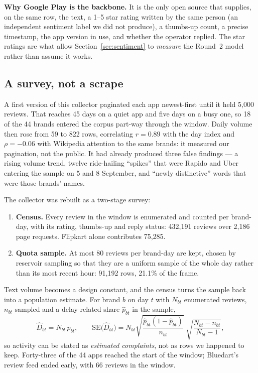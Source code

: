 \documentclass[11pt,a4paper]{article}
\begin{document}
\textbf{Why Google Play is the backbone.} It is the only open source that supplies, on the same row, the text, a 1--5 star rating written by the same person (an independent sentiment label we did not produce), a thumbs-up count, a precise timestamp, the app version in use, and whether the operator replied. The star ratings are what allow Section~\ref{sec:sentiment} to \emph{measure} the Round~2 model rather than assume it works.

\subsection{A survey, not a scrape}

A first version of this collector paginated each app newest-first until it held 5,000 reviews. That reaches 45 days on a quiet app and five days on a busy one, so 18 of the 44 brands entered the corpus part-way through the window. Daily volume then rose from 59 to 822 rows, correlating $r=0.89$ with the day index and $\rho=-0.06$ with Wikipedia attention to the same brands: it measured our pagination, not the public. It had already produced three false findings --- a rising volume trend, twelve ride-hailing ``spikes'' that were Rapido and Uber entering the sample on 5 and 8 September, and ``newly distinctive'' words that were those brands' names.

The collector was rebuilt as a two-stage survey:
\begin{enumerate}
\item \textbf{Census.} Every review in the window is enumerated and counted per brand-day, with its rating, thumbs-up and reply status: 432,191 reviews over 2,186 page requests. Flipkart alone contributes 75,285.
\item \textbf{Quota sample.} At most 80 reviews per brand-day are kept, chosen by reservoir sampling so that they are a uniform sample of the whole day rather than its most recent hour: 91,192 rows, 21.1\% of the frame.
\end{enumerate}
Text volume becomes a design constant, and the census turns the sample back into a population estimate. For brand $b$ on day $t$ with $N_{bt}$ enumerated reviews, $n_{bt}$ sampled and a delay-related share $\hat p_{bt}$ in the sample,
\[
\widehat{D}_{bt}=N_{bt}\,\hat p_{bt},\qquad
\mathrm{SE}\big(\widehat{D}_{bt}\big)=N_{bt}\sqrt{\frac{\hat p_{bt}(1-\hat p_{bt})}{n_{bt}}}\;\sqrt{\frac{N_{bt}-n_{bt}}{N_{bt}-1}},
\]
so activity can be stated as \emph{estimated complaints}, not as rows we happened to keep. Forty-three of the 44 apps reached the start of the window; Bluedart's review feed ended early, with 66 reviews in the window.
\end{document}
